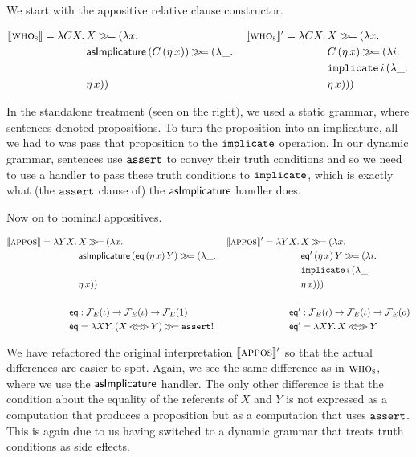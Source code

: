 We start with the appositive relative clause constructor.

\begin{align*}
  \llbracket \textsc{who}_{\textsc{s}} \rrbracket = \lambda C X.\, 
      &X \mathbin{\gg\!=} (\lambda x.\, 
 &\llbracket \textsc{who}_{\textsc{s}} \rrbracket' = \lambda C X.\, 
      &X \mathbin{\gg\!=} (\lambda x.\,  \\
      &\textsf{asImplicature}\,(C\,(\eta\,x)) \mathbin{\gg\!=} (\lambda \_.\, 
     &&C\,(\eta\,x) \mathbin{\gg\!=} (\lambda i.\,  \\
      &
     &&\mathtt{implicate}\,i\,(\lambda \_.\,  \\
      &\eta\,x))
     &&\eta\,x)))
\end{align*}

In the standalone treatment (seen on the right), we used a static grammar,
where sentences denoted propositions. To turn the proposition into an
implicature, all we had to was pass that proposition to the
$\mathtt{implicate}$ operation. In our dynamic grammar, sentences use
$\mathtt{assert}$ to convey their truth conditions and so we need to use a
handler to pass these truth conditions to $\mathtt{implicate}$, which is
exactly what (the $\mathtt{assert}$ clause of) the $\textsf{asImplicature}$ handler
does.

Now on to nominal appositives.

\begin{align*}
  \sem{\abs{appos}} = \lam{Y X}{
    &X \hsbind (\lam{x}{
 &\sem{\abs{appos}}' = \lam{Y X}{
    &X \hsbind (\lam{x}{ \\
    &\ap{\asImplicature}{(\app{\eq}{(\etaE{x})}{Y})} \hsbind (\lam{\_}{
   &&\app{\eq'}{(\etaE{x})}{Y} \hsbind (\lam{i}{ \\
    &
   &&\app{\op{implicate}}{i}{(\lam{\_}{ \\
    &\etaE{x}})})}
   &&\etaE{x}})}})})} \\
  \\
  \eq  &: \FF_E(\iota) \to \FF_E(\iota) \to \FF_E(1)
 &\eq' &: \FF_E(\iota) \to \FF_E(\iota) \to \FF_E(o) \\
  \eq  &= \lam{X Y}{(X \eqlr Y) \hsbind \op{assert}!}
 &\eq' &= \lam{X Y}{X \eqlr Y}
\end{align*}

We have refactored the original interpretation $\llbracket \textsc{appos} \rrbracket'$ so that
the actual differences are easier to spot. Again, we see the same
difference as in $\textsc{who}_{\textsc{s}}$, where we use the $\textsf{asImplicature}$
handler. The only other difference is that the condition about the equality
of the referents of $X$ and $Y$ is not expressed as a computation that
produces a proposition but as a computation that uses $\mathtt{assert}$. This
is again due to us having switched to a dynamic grammar that treats truth
conditions as side effects.

